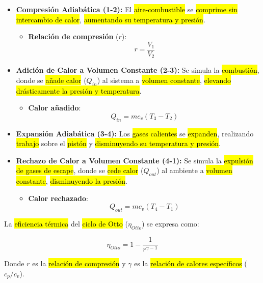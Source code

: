 \documentclass{article}
\begin{document}
\begin{itemize}
    \item \textbf{Compresión Adiabática (1-2):} El \hl{aire-combustible} se \hl{comprime sin intercambio de calor}, \hl{aumentando su temperatura y presión}.
    \begin{itemize}
        \item \textbf{Relación de compresión} ($r$):
        $$
        	r = \frac{V_1}{V_2}
        $$
        
    \end{itemize}

    \item \textbf{Adición de Calor a Volumen Constante (2-3):} Se simula la \hl{combustión}, donde se \hl{añade calor} ($Q_{in}$) al sistema a \hl{volumen constante}, \hl{elevando drásticamente la presión y temperatura}.
    \begin{itemize}
        \item \textbf{Calor añadido}:
        $$
        	Q_{in} = m c_v (T_3 - T_2)
        $$
    \end{itemize}

    \item \textbf{Expansión Adiabática (3-4):} Los \hl{gases calientes} se \hl{expanden}, realizando \hl{trabajo} sobre el \hl{pistón} y \hl{disminuyendo su temperatura y presión}.

    \item \textbf{Rechazo de Calor a Volumen Constante (4-1):} Se simula la \hl{expulsión de gases de escape}, donde se \hl{cede calor} ($Q_{out}$) al ambiente a \hl{volumen constante}, \hl{disminuyendo la presión}.
    \begin{itemize}
        \item \textbf{Calor rechazado}:
        $$
        	Q_{out} = m c_v (T_4 - T_1)
        $$
    \end{itemize}
\end{itemize}

La \hl{eficiencia térmica} del \hl{ciclo de Otto} ($\eta_{Otto}$) se expresa como:

$$
	\eta_{Otto} = 1 - \frac{1}{r^{\gamma-1}}
$$

Donde $r$ es la \hl{relación de compresión} y $\gamma$ es la \hl{relación de calores específicos} ($c_p/c_v$).
\end{document}
